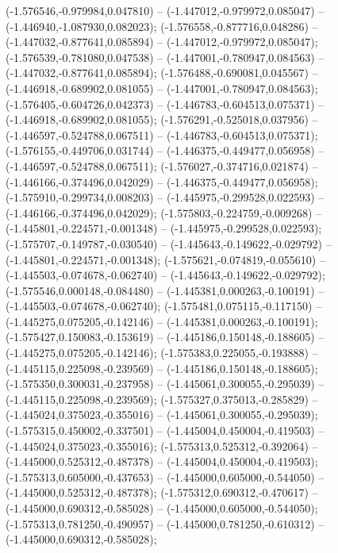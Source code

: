  (-1.576546,-0.979984,0.047810) -- (-1.447012,-0.979972,0.085047) -- (-1.446940,-1.087930,0.082023);
 (-1.576558,-0.877716,0.048286) -- (-1.447032,-0.877641,0.085894) -- (-1.447012,-0.979972,0.085047);
 (-1.576539,-0.781080,0.047538) -- (-1.447001,-0.780947,0.084563) -- (-1.447032,-0.877641,0.085894);
 (-1.576488,-0.690081,0.045567) -- (-1.446918,-0.689902,0.081055) -- (-1.447001,-0.780947,0.084563);
 (-1.576405,-0.604726,0.042373) -- (-1.446783,-0.604513,0.075371) -- (-1.446918,-0.689902,0.081055);
 (-1.576291,-0.525018,0.037956) -- (-1.446597,-0.524788,0.067511) -- (-1.446783,-0.604513,0.075371);
 (-1.576155,-0.449706,0.031744) -- (-1.446375,-0.449477,0.056958) -- (-1.446597,-0.524788,0.067511);
 (-1.576027,-0.374716,0.021874) -- (-1.446166,-0.374496,0.042029) -- (-1.446375,-0.449477,0.056958);
 (-1.575910,-0.299734,0.008203) -- (-1.445975,-0.299528,0.022593) -- (-1.446166,-0.374496,0.042029);
 (-1.575803,-0.224759,-0.009268) -- (-1.445801,-0.224571,-0.001348) -- (-1.445975,-0.299528,0.022593);
 (-1.575707,-0.149787,-0.030540) -- (-1.445643,-0.149622,-0.029792) -- (-1.445801,-0.224571,-0.001348);
 (-1.575621,-0.074819,-0.055610) -- (-1.445503,-0.074678,-0.062740) -- (-1.445643,-0.149622,-0.029792);
 (-1.575546,0.000148,-0.084480) -- (-1.445381,0.000263,-0.100191) -- (-1.445503,-0.074678,-0.062740);
 (-1.575481,0.075115,-0.117150) -- (-1.445275,0.075205,-0.142146) -- (-1.445381,0.000263,-0.100191);
 (-1.575427,0.150083,-0.153619) -- (-1.445186,0.150148,-0.188605) -- (-1.445275,0.075205,-0.142146);
 (-1.575383,0.225055,-0.193888) -- (-1.445115,0.225098,-0.239569) -- (-1.445186,0.150148,-0.188605);
 (-1.575350,0.300031,-0.237958) -- (-1.445061,0.300055,-0.295039) -- (-1.445115,0.225098,-0.239569);
 (-1.575327,0.375013,-0.285829) -- (-1.445024,0.375023,-0.355016) -- (-1.445061,0.300055,-0.295039);
 (-1.575315,0.450002,-0.337501) -- (-1.445004,0.450004,-0.419503) -- (-1.445024,0.375023,-0.355016);
 (-1.575313,0.525312,-0.392064) -- (-1.445000,0.525312,-0.487378) -- (-1.445004,0.450004,-0.419503);
 (-1.575313,0.605000,-0.437653) -- (-1.445000,0.605000,-0.544050) -- (-1.445000,0.525312,-0.487378);
 (-1.575312,0.690312,-0.470617) -- (-1.445000,0.690312,-0.585028) -- (-1.445000,0.605000,-0.544050);
 (-1.575313,0.781250,-0.490957) -- (-1.445000,0.781250,-0.610312) -- (-1.445000,0.690312,-0.585028);
